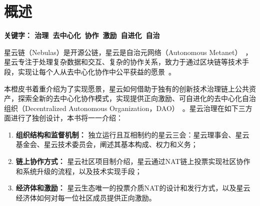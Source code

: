 \section{概述}

\textbf{关键字： 治理\ 去中心化\ 协作\ 激励\ 自进化\ 自治 }

\vspace{2em}

星云链（Nebulas）是开源公链，星云是自治元网络（Autonomous Metanet）~\cite{AutonomousMetanet}，星云专注于处理复杂数据和交互、复杂的协作关系，致力于通过区块链等技术手段，实现让每个人从去中心化协作中公平获益的愿景~\cite{vision}。

本橙皮书着重介绍为了实现愿景，星云如何借助于独有的创新技术治理链上公共资产，探索全新的去中心化协作模式，实现提供正向激励、可自进化的去中心化自治组织（Decentralized Autonomous Organization，DAO）~\cite{DAO}。星云治理在如下三方面进行了独创设计，本书将一一介绍：

\begin{enumerate}
	\item \textbf{组织结构和监督机制：}
	独立运行且互相制约的星云三会：星云理事会、星云基金会、星云技术委员会，阐述其基本构成、权力和义务；
	\item \textbf{链上协作方式：}
	星云社区项目制介绍，星云通过NAT链上投票实现社区协作和系统升级的流程，以及技术实现手段；
	\item \textbf{经济体和激励：}
	星云生态唯一的投票介质NAT的设计和发行方式，以及星云经济体如何对每一位社区成员提供正向激励。
\end{enumerate}